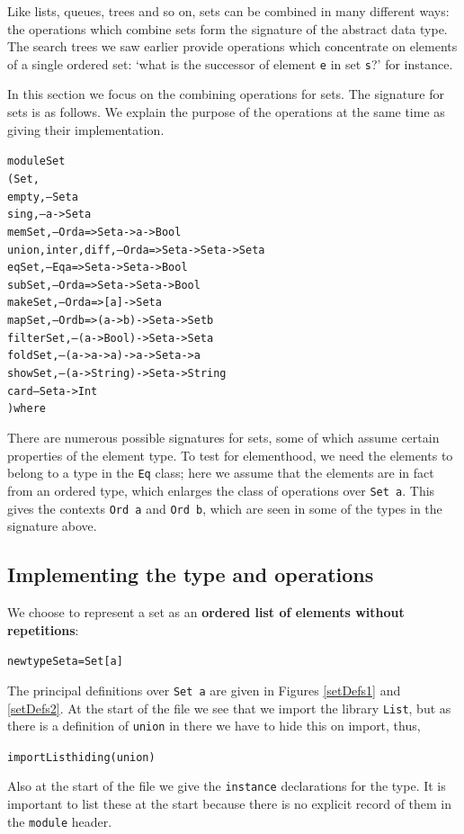 Like lists, queues, trees and so on,
sets can be combined in many different ways:
the operations which combine sets form the signature of the abstract data type.
The search trees we saw
earlier provide operations which concentrate on elements of a single ordered
set:
`what is the successor of element \texttt{e} in set \texttt{s}?' for instance. 

In
this section we focus on the combining operations for sets.
The signature
for sets is as follows. We explain the purpose of
the operations at the same time as giving their implementation.
\begin{alltt}
module Set 
 ( Set ,
  empty              , -- Set a
  sing               , -- a -> Set a
  memSet             , -- Ord a => Set a -> a -> Bool
  union,inter,diff   , -- Ord a => Set a -> Set a -> Set a
  eqSet              , -- Eq a  => Set a -> Set a -> Bool
  subSet             , -- Ord a => Set a -> Set a -> Bool
  makeSet            , -- Ord a => [a] -> Set a
  mapSet             , -- Ord b => (a -> b) -> Set a -> Set b
  filterSet          , -- (a->Bool) -> Set a -> Set a
  foldSet            , -- (a -> a -> a) -> a -> Set a -> a
  showSet            , -- (a -> String) -> Set a -> String
  card                 -- Set a -> Int
 ) where
\end{alltt}
There are numerous possible signatures for sets, some of which assume certain
properties of the element type. To test for elementhood, we need the elements
to belong to a type in the \texttt{Eq} class; here we assume that the elements
are in fact from an ordered type, which enlarges the class of operations over
\texttt{Set a}. This gives the contexts 
\texttt{Ord a} and \texttt{Ord b}, which are seen in some of the types in the signature
above.

\subsection*{Implementing the type and operations}

We choose to represent a set as an \textbf{ordered list of
elements without repetitions}:
\begin{alltt}
newtype Set a = Set [a]
\end{alltt}
The principal definitions over \texttt{Set a} are given in Figures
\ref{setDefs1} and \ref{setDefs2}. At the start of the file we see that 
we import the library \texttt{List}, but as there is
a definition of \texttt{union} in there we have to hide this
on import, thus,
\begin{alltt}
import List hiding ( union )
\end{alltt}
Also at the start of the file we give the \texttt{instance} declarations
for the type. It is important to list these at the start because there
is no explicit record of them in the \texttt{module} header.

